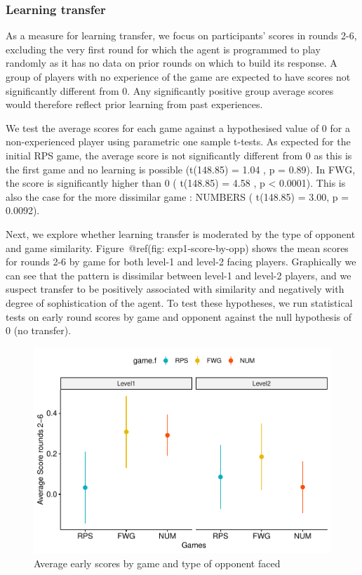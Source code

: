 \documentclass[man,floatsintext]{apa6}
\begin{document}
\hypertarget{learning-transfer}{%
\subsubsection{Learning transfer}\label{learning-transfer}}

As a measure for learning transfer, we focus on participants' scores in rounds 2-6, excluding the very first round for which the agent is programmed to play randomly as it has no data on prior rounds on which to build its response. A group of players with no experience of the game are expected to have scores not significantly different from 0. Any significantly positive group average scores would therefore reflect prior learning from past experiences.

We test the average scores for each game against a hypothesised value of 0 for a non-experienced player using parametric one sample t-tests. As expected for the initial RPS game, the average score is not significantly different from 0 as this is the first game and no learning is possible (t(148.85) = 1.04 , p = 0.89). In FWG, the score is significantly higher than 0 ( t(148.85) = 4.58 , p \textless{} 0.0001). This is also the case for the more dissimilar game : NUMBERS ( t(148.85) = 3.00, p = 0.0092).

Next, we explore whether learning transfer is moderated by the type of opponent and game similarity. Figure~@ref(fig: exp1-score-by-opp) shows the mean scores for rounds 2-6 by game for both level-1 and level-2 facing players. Graphically we can see that the pattern is dissimilar between level-1 and level-2 players, and we suspect transfer to be positively associated with similarity and negatively with degree of sophistication of the agent. To test these hypotheses, we run statistical tests on early round scores by game and opponent against the null hypothesis of 0 (no transfer).

\begin{figure}

{\centering \includegraphics{draft_report_v1_files/figure-latex/exp1-score-by-opp-1} 

}

\caption{Average early scores by game and type of opponent faced}\label{fig:exp1-score-by-opp}
\end{figure}
\end{document}

